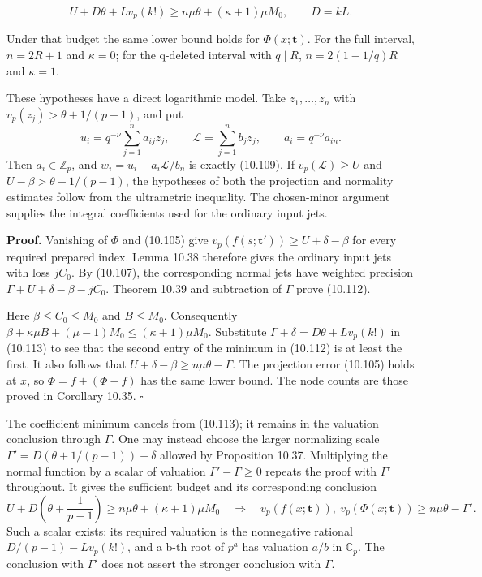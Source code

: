 \documentclass[
  11pt,
  a4paper,
]{article}
\begin{document}
\[
U+D\theta+L v_p(k!)\ge n\mu\theta+(\kappa+1)\mu M_0,
\qquad D=kL.
\tag{10.113}
\]

Under that budget the same lower bound holds for
\(\Phi(x;\boldsymbol t)\). For the full interval, \(n=2R+1\) and
\(\kappa=0\); for the q-deleted interval with \(q\mid R\),
\(n=2(1-1/q)R\) and \(\kappa=1\).

These hypotheses have a direct logarithmic model. Take
\(z_1,\ldots,z_n\) with \(v_p(z_j)>\theta+1/(p-1)\), and put \[
u_i=q^{-\nu}\sum_{j=1}^na_{ij}z_j,
\qquad \mathcal L=\sum_{j=1}^nb_jz_j,
\qquad a_i=q^{-\nu}a_{in}.
\] Then \(a_i\in\mathbb Z_p\), and \(w_i=u_i-a_i\mathcal L/b_n\) is
exactly (10.109). If \(v_p(\mathcal L)\ge U\) and
\(U-\beta>\theta+1/(p-1)\), the hypotheses of both the projection and
normality estimates follow from the ultrametric inequality. The
chosen-minor argument supplies the integral coefficients used for the
ordinary input jets.

\textbf{Proof.} Vanishing of \(\Phi\) and (10.105) give
\(v_p(f(s;\boldsymbol t'))\ge U+\delta-\beta\) for every required
prepared index. Lemma 10.38 therefore gives the ordinary input jets with
loss \(jC_0\). By (10.107), the corresponding normal jets have weighted
precision \(\Gamma+U+\delta-\beta-jC_0\). Theorem 10.39 and subtraction
of \(\Gamma\) prove (10.112).

Here \(\beta\le C_0\le M_0\) and \(B\le M_0\). Consequently
\(\beta+\kappa\mu B+(\mu-1)M_0\le(\kappa+1)\mu M_0\). Substitute
\(\Gamma+\delta=D\theta+Lv_p(k!)\) in (10.113) to see that the second
entry of the minimum in (10.112) is at least the first. It also follows
that \(U+\delta-\beta\ge n\mu\theta-\Gamma\). The projection error
(10.105) holds at \(x\), so \(\Phi=f+(\Phi-f)\) has the same lower
bound. The node counts are those proved in Corollary 10.35. \(\square\)

The coefficient minimum cancels from (10.113); it remains in the
valuation conclusion through \(\Gamma\). One may instead choose the
larger normalizing scale \(\Gamma'=D(\theta+1/(p-1))-\delta\) allowed by
Proposition 10.37. Multiplying the normal function by a scalar of
valuation \(\Gamma'-\Gamma\ge0\) repeats the proof with \(\Gamma'\)
throughout. It gives the sufficient budget and its corresponding
conclusion \[
U+D\left(\theta+\frac1{p-1}\right)
\ge n\mu\theta+(\kappa+1)\mu M_0
\quad\Longrightarrow\quad
v_p(f(x;\boldsymbol t)),\ v_p(\Phi(x;\boldsymbol t))\ge n\mu\theta-\Gamma'.
\tag{10.114}
\] Such a scalar exists: its required valuation is the nonnegative
rational \(D/(p-1)-L v_p(k!)\), and a b-th root of \(p^a\) has valuation
\(a/b\) in \(\mathbb C_p\). The conclusion with \(\Gamma'\) does not
assert the stronger conclusion with \(\Gamma\).
\end{document}
